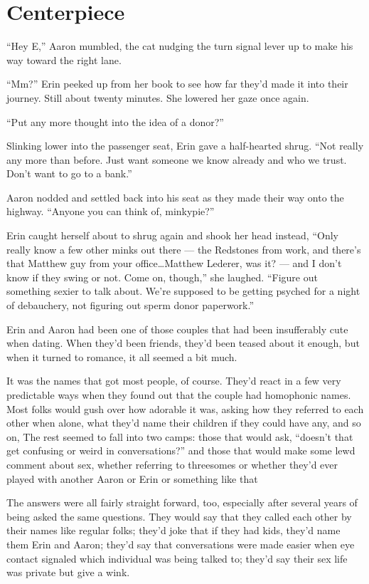 \hypertarget{centerpiece}{%
\chapter{Centerpiece}\label{centerpiece}}

``Hey E,'' Aaron mumbled, the cat nudging the turn signal lever up to make his way toward the right lane.

``Mm?'' Erin peeked up from her book to see how far they'd made it into their journey. Still about twenty minutes. She lowered her gaze once again.

``Put any more thought into the idea of a donor?''

Slinking lower into the passenger seat, Erin gave a half-hearted shrug. ``Not really any more than before. Just want someone we know already and who we trust. Don't want to go to a bank.''

Aaron nodded and settled back into his seat as they made their way onto the highway. ``Anyone you can think of, minkypie?''

Erin caught herself about to shrug again and shook her head instead, ``Only really know a few other minks out there --- the Redstones from work, and there's that Matthew guy from your office\ldots{}Matthew Lederer, was it? --- and I don't know if they swing or not. Come on, though,'' she laughed. ``Figure out something sexier to talk about. We're supposed to be getting psyched for a night of debauchery, not figuring out sperm donor paperwork.''

Erin and Aaron had been one of those couples that had been insufferably cute when dating. When they'd been friends, they'd been teased about it enough, but when it turned to romance, it all seemed a bit much.

It was the names that got most people, of course. They'd react in a few very predictable ways when they found out that the couple had homophonic names. Most folks would gush over how adorable it was, asking how they referred to each other when alone, what they'd name their children if they could have any, and so on, The rest seemed to fall into two camps: those that would ask, ``doesn't that get confusing or weird in conversations?'' and those that would make some lewd comment about sex, whether referring to threesomes or whether they'd ever played with another Aaron or Erin or something like that

The answers were all fairly straight forward, too, especially after several years of being asked the same questions. They would say that they called each other by their names like regular folks; they'd joke that if they had kids, they'd name them Erin and Aaron; they'd say that conversations were made easier when eye contact signaled which individual was being talked to; they'd say their sex life was private but give a wink.

